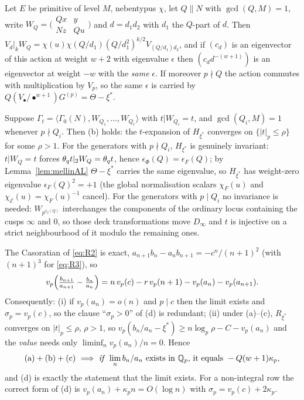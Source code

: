 \begin{lemma}
\label{lem:mellinAL}
\Proved{} Let $E$ be primitive of level $M$, nebentypus $\chi$, let $Q\|N$ with
$\gcd(Q,M)=1$, write $W_Q=\bigl(\begin{smallmatrix}Qx&y\\Nz&Qu\end{smallmatrix}\bigr)$
and $d=d_1d_2$ with $d_1$ the $Q$-part of $d$.  Then
$V_d|_kW_Q=\chi(u)\chi(Q/d_1)(Q/d_1^2)^{k/2}V_{(Q/d_1)d_2}$, and if
$(c_d)$ is an eigenvector of this action at weight $w+2$ with eigenvalue
$\epsilon$ then $(c_dd^{-(w+1)})$ is an eigenvector at weight $-w$ with the
\emph{same} $\epsilon$.  If moreover $p\nmid Q$ the action commutes with
multiplication by $V_p$, so the same $\epsilon$ is carried by
$Q(V_\bullet/\bullet^{w+1})G^{(p)}=\Theta-\xi^*$.
\end{lemma}

\begin{theorem}\label{thm:descentauto}
\Proved{} Suppose $\Gamma_t=\langle\Gamma_0(N),W_{Q_1},\dots,W_{Q_r}\rangle$
with $t|W_{Q_i}=t$, and $\gcd(Q_i,M)=1$ whenever $p\nmid Q_i$.  Then
\textup{(b)} holds: the $t$-expansion of $H_{\xi^*}$ converges on
$\{|t|_p\le\rho\}$ for some $\rho>1$.  For the generators with $p\nmid Q_i$,
$H_{\xi^*}$ is genuinely invariant: $t|W_Q=t$ forces
$\theta_q t|_2W_Q=\theta_q t$, hence $\epsilon_\Phi(Q)=\epsilon_F(Q)$; by
Lemma~\ref{lem:mellinAL} $\Theta-\xi^*$ carries the same eigenvalue, so
$H_{\xi^*}$ has weight-zero eigenvalue $\epsilon_F(Q)^2=+1$ (the global
normalisation scalars $\chi_F(u)$ and $\chi_{\mathcal E}(u)=\chi_F(u)^{-1}$
cancel).  For the generators with $p\mid Q_i$ no invariance is needed:
$W_{p^{v_p(Q)}}$ interchanges the components of the ordinary locus containing
the cusps $\infty$ and $0$, so those deck transformations move $D_\infty$ and
$t$ is injective on a strict neighbourhood of it modulo the remaining ones.
\end{theorem}

\begin{proposition}\label{prop:dsplit}
\Proved{} The Casoratian of \eqref{eq:R2} is exact,
$a_{n+1}b_n-a_nb_{n+1}=-c^n/(n+1)^2$ (with $(n+1)^3$ for \eqref{eq:R3}), so
\[
v_p\Bigl(\tfrac{b_{n+1}}{a_{n+1}}-\tfrac{b_n}{a_n}\Bigr)
= n\,v_p(c)-r\,v_p(n+1)-v_p(a_n)-v_p(a_{n+1}).
\]
Consequently: \textup{(i)} if $v_p(a_n)=o(n)$ and $p\mid c$ then the limit
exists and $\sigma_p=v_p(c)$, so the clause ``$\sigma_p>0$'' of \textup{(d)}
is redundant; \textup{(ii)} under \textup{(a)}--\textup{(c)}, $R_{\xi^*}$
converges on $|t|_p\le\rho$, $\rho>1$, so
$v_p(b_n/a_n-\xi^*)\ge n\log_p\rho-C-v_p(a_n)$ and the \emph{value} needs only
$\liminf_nv_p(a_n)/n=0$.  Hence
\[
\textup{(a)}+\textup{(b)}+\textup{(c)}\ \Longrightarrow\
\text{\emph{if} }\lim_nb_n/a_n\text{ exists in }\Q_p\text{, it equals }
-Q(w+1)\kappa_p ,
\]
and \textup{(d)} is exactly the statement that the limit exists.  For a
non-integral row the correct form of \textup{(d)} is
$v_p(a_n)+\kappa_pn=O(\log n)$ with $\sigma_p=v_p(c)+2\kappa_p$.
\end{proposition}

